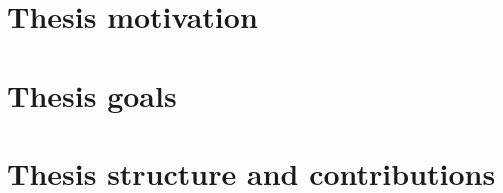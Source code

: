 \section{Thesis motivation}


\section{Thesis goals}


\section{Thesis structure and contributions}


